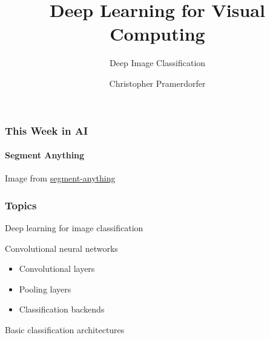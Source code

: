 \documentclass[xetex,professionalfont]{beamer}
\title{Deep Learning for Visual Computing}
\subtitle{Deep Image Classification}
\author{Christopher Pramerdorfer}
\institute{Computer Vision Lab, TU Wien}
\begin{document}
\begin{frame}
\maketitle
\end{frame}


\begin{frame}
  \frametitle{This Week in AI}
  \framesubtitle{Segment Anything}
  

  \begin{center}
    {\centering Image from \href{https://segment-anything.com/}{segment-anything}}
  \end{center}
    
\end{frame}


\begin{frame}
\frametitle{Topics}

Deep learning for image classification

\bigskip

Convolutional neural networks
\begin{itemize}
    \item Convolutional layers
    \item Pooling layers
    \item Classification backends
\end{itemize}

\bigskip

Basic classification architectures

\end{frame}
\end{document}

